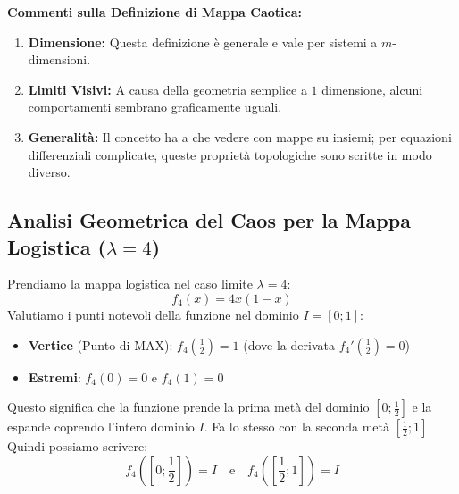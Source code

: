 \documentclass[openany]{book}
\theoremstyle{definition}
\theoremstyle{remark}
\begin{document}
\begin{enumerate}
\begin{center}
    \end{center}
\end{enumerate}

\textbf{Commenti sulla Definizione di Mappa Caotica:}
\begin{enumerate}
    \item \textbf{Dimensione:} Questa definizione è generale e vale per sistemi a $m$-dimensioni.
    \item \textbf{Limiti Visivi:} A causa della geometria semplice a $1$ dimensione, alcuni comportamenti sembrano graficamente uguali.
    \item \textbf{Generalità:} Il concetto ha a che vedere con mappe su insiemi; per equazioni differenziali complicate, queste proprietà topologiche sono scritte in modo diverso.
\end{enumerate}


\subsection*{Analisi Geometrica del Caos per la Mappa Logistica ($\lambda = 4$)}

Prendiamo la mappa logistica nel caso limite $\lambda = 4$:
$$ f_4(x) = 4x(1 - x) $$
Valutiamo i punti notevoli della funzione nel dominio $I = [0; 1]$:
\begin{itemize}
    \item \textbf{Vertice} (Punto di MAX): $f_4\left(\frac{1}{2}\right) = 1$ \quad (dove la derivata $f_4'\left(\frac{1}{2}\right) = 0$)
    \item \textbf{Estremi}: $f_4(0) = 0$ e $f_4(1) = 0$
\end{itemize}

Questo significa che la funzione prende la prima metà del dominio $[0; \frac{1}{2}]$ e la espande coprendo l'intero dominio $I$. Fa lo stesso con la seconda metà $[\frac{1}{2}; 1]$.
Quindi possiamo scrivere:
$$ f_4\left( \left[0; \frac{1}{2}\right] \right) = I \quad \text{e} \quad f_4\left( \left[\frac{1}{2}; 1\right] \right) = I $$
\end{document}
